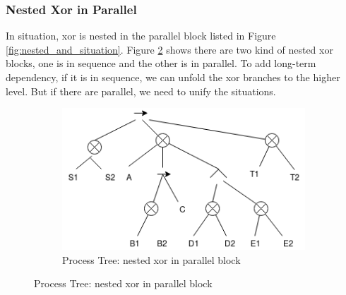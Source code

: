 \documentclass[]{article}
\begin{document}
\subsubsection{Nested Xor in Parallel}
In situation, xor is nested in the parallel block listed in Figure \ref{fig:nested_and_situation}. Figure \ref{fig:pt_nested_xor_in_parallel} shows there are two kind of nested xor blocks, one is in sequence and the other is in parallel. To add long-term dependency, if it is in sequence, we can unfold the xor branches to the higher level. But if there are parallel, we need to unify the situations. 
\begin{figure}[h]
	\centering
	\begin{subfigure}[b]{\textwidth}
		\centering
		\includegraphics[width=\linewidth]{PT10_NestedXorInParallel_01.png}
		\caption{Process Tree: nested xor in parallel block}
		\label{fig:pt_nested_xor_in_parallel}
	\end{subfigure}%


\end{figure}
\end{document}

